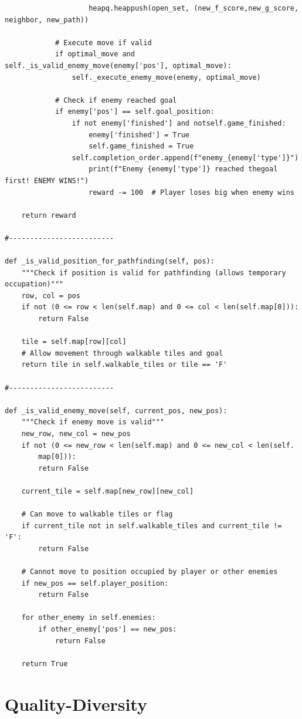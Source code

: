 \documentclass{article} %
\begin{document}
\begin{lstlisting}
                    heapq.heappush(open_set, (new_f_score,new_g_score, neighbor, new_path))
            
            # Execute move if valid
            if optimal_move and self._is_valid_enemy_move(enemy['pos'], optimal_move):
                self._execute_enemy_move(enemy, optimal_move)
            
            # Check if enemy reached goal
            if enemy['pos'] == self.goal_position:
                if not enemy['finished'] and notself.game_finished:
                    enemy['finished'] = True
                    self.game_finished = True
                self.completion_order.append(f"enemy_{enemy['type']}")
                    print(f"Enemy {enemy['type']} reached thegoal first! ENEMY WINS!")
                    reward -= 100  # Player loses big when enemy wins
                        
    return reward

#-------------------------

def _is_valid_position_for_pathfinding(self, pos):
    """Check if position is valid for pathfinding (allows temporary occupation)"""
    row, col = pos
    if not (0 <= row < len(self.map) and 0 <= col < len(self.map[0])):
        return False
    
    tile = self.map[row][col]
    # Allow movement through walkable tiles and goal
    return tile in self.walkable_tiles or tile == 'F'

#-------------------------

def _is_valid_enemy_move(self, current_pos, new_pos):
    """Check if enemy move is valid"""
    new_row, new_col = new_pos
    if not (0 <= new_row < len(self.map) and 0 <= new_col < len(self.
        map[0])):
        return False
        
    current_tile = self.map[new_row][new_col]
    
    # Can move to walkable tiles or flag
    if current_tile not in self.walkable_tiles and current_tile != 'F':
        return False
        
    # Cannot move to position occupied by player or other enemies
    if new_pos == self.player_position:
        return False
        
    for other_enemy in self.enemies:
        if other_enemy['pos'] == new_pos:
            return False
            
    return True
\end{lstlisting}

\section{Quality-Diversity}
\label{appendixC}
\end{document}
